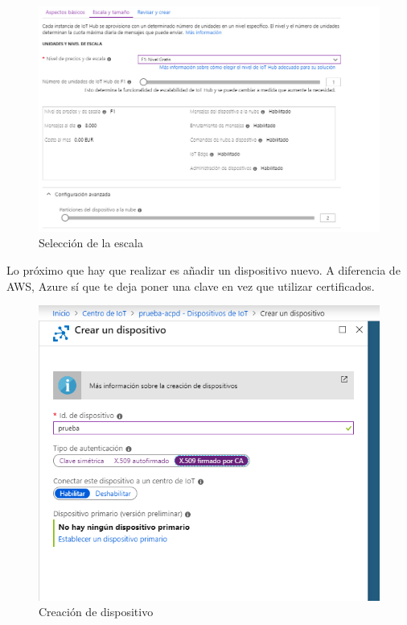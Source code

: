 \begin{figure}[h]
	\centering
	\includegraphics[scale=0.5]{iot_azure/escala.png}
	\caption{Selección de la escala}
	\label{AZIOT2}
\end{figure}

\newpage
Lo próximo que hay que realizar es añadir un dispositivo nuevo. A diferencia de AWS, Azure sí que te deja poner una clave en vez que utilizar certificados.

\begin{figure}[h]
	\centering
	\includegraphics[scale=0.5]{iot_azure/dispositivo.png}
	\caption{Creación de dispositivo}
	\label{AZIOT3}
\end{figure}

